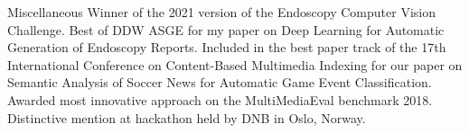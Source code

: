 \begin{rubric}{Miscellaneous}
\entry*[2021] Winner of the 2021 version of the Endoscopy Computer Vision Challenge.
%
\entry*[2019] Best of DDW ASGE for my paper on Deep Learning for Automatic Generation of Endoscopy Reports.
%
\entry*[2019] Included in the best paper track of the 17th International Conference on Content-Based Multimedia Indexing for our paper on Semantic Analysis of Soccer News for Automatic Game Event Classification.
%
\entry*[2018] Awarded most innovative approach on the MultiMediaEval benchmark 2018.
%
\entry*[2017] Distinctive mention at hackathon held by DNB in Oslo, Norway.
\end{rubric}